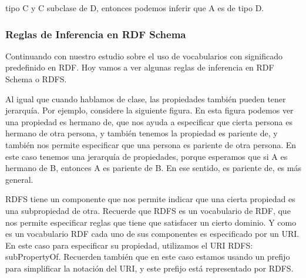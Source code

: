 tipo C y C subclase de D, entonces podemos inferir que A es de tipo D.


\subsubsection{Reglas de Inferencia en RDF Schema}

Continuando con nuestro estudio sobre el uso de vocabularios con significado predefinido en RDF. Hoy vamos a ver algunas reglas de inferencia en RDF Schema o RDFS.

Al igual que cuando hablamos de clase, las propiedades también pueden tener jerarquía. Por ejemplo, considere la siguiente figura. En esta figura podemos ver una propiedad es hermano de, que nos ayuda a especificar que cierta persona es hermano de otra persona, y también tenemos la propiedad es pariente de, y también nos permite especificar que una persona es pariente de otra persona. En este caso tenemos una jerarquía de propiedades, porque esperamos que si A es hermano de B, entonces A es pariente de B. En ese sentido, es pariente de, es más general.

RDFS tiene un componente que nos permite indicar que una cierta propiedad es una subpropiedad de otra. Recuerde que RDFS es un vocabulario de RDF, que nos permite especificar reglas que tiene que satisfacer un cierto dominio. Y como es un vocabulario RDF cada uno de sus componentes es especificado por un URI. En este caso para especificar su propiedad, utilizamos el URI RDFS: subPropertyOf. Recuerden también que en este caso estamos usando un prefijo para simplificar la notación del URI, y este prefijo está representado por RDFS.

